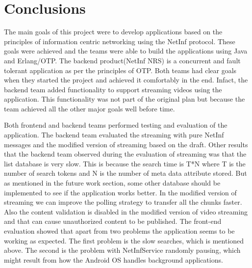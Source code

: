 \section{Conclusions}
The main goals of this project were to develop applications based on the principles of information centric networking using the NetInf protocol. These goals were achieved and the teams were able to build the applications using Java and Erlang/OTP. The backend product(NetInf NRS) is a concurrent and fault tolerant application as per the principles of OTP. Both teams had clear goals when they started the project and achieved it comfortably in the end. Infact, the backend team added functionality to support streaming videos using the application. This functionality was not part of the original plan but because the team achieved all the other major goals well before time.

Both frontend and backend teams performed testing and evaluation of the application. The backend team evaluated the streaming with pure NetInf messages and the modified version of streaming based on the draft. Other results that the backend team observed during the evaluation of streaming was that the list database is very slow. This is because the search time is T*N where T is the number of search tokens and N is the number of meta data attribute stored. But as mentioned in the future work section, some other database should be implemented to see if the application works better. In the modified version of streaming we can improve the polling strategy to transfer all the chunks faster. Also the content validation is disabled in the modified version of video streaming and that can cause unauthorized content to be published. The front-end evaluation showed that apart from two problems the application seems to be working as expected. The first problem is the slow searches, which is mentioned above. The second is the problem with NetInfService randomly pausing, which might result from how the Android OS handles background applications.

 
